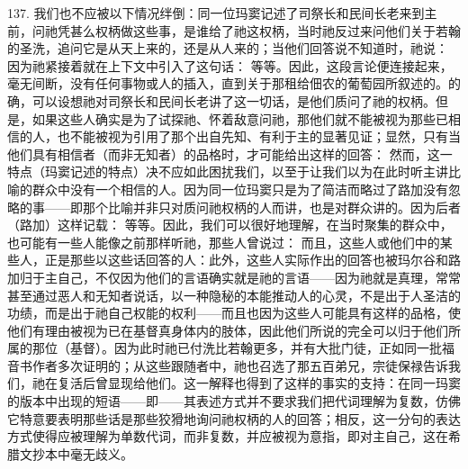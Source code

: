 137. 我们也不应被以下情况绊倒：同一位玛窦记述了司祭长和民间长老来到主前，问祂凭甚么权柄做这些事，是谁给了祂这权柄，当时祂反过来问他们关于若翰的圣洗，追问它是从天上来的，还是从人来的；当他们回答说不知道时，祂说： 因为祂紧接着就在上下文中引入了这句话： 等等。因此，这段言论便连接起来，毫无间断，没有任何事物或人的插入，直到关于那租给佃农的葡萄园所叙述的。的确，可以设想祂对司祭长和民间长老讲了这一切话，是他们质问了祂的权柄。但是，如果这些人确实是为了试探祂、怀着敌意问祂，那他们就不能被视为那些已相信的人，也不能被视为引用了那个出自先知、有利于主的显著见证；显然，只有当他们具有相信者（而非无知者）的品格时，才可能给出这样的回答： 然而，这一特点（玛窦记述的特点）决不应如此困扰我们，以至于让我们以为在此时听主讲比喻的群众中没有一个相信的人。因为同一位玛窦只是为了简洁而略过了路加没有忽略的事——即那个比喻并非只对质问祂权柄的人而讲，也是对群众讲的。因为后者（路加）这样记载： 等等。因此，我们可以很好地理解，在当时聚集的群众中，也可能有一些人能像之前那样听祂，那些人曾说过： 而且，这些人或他们中的某些人，正是那些以这些话回答的人：此外，这些人实际作出的回答也被玛尔谷和路加归于主自己，不仅因为他们的言语确实就是祂的言语——因为祂就是真理，常常甚至通过恶人和无知者说话，以一种隐秘的本能推动人的心灵，不是出于人圣洁的功绩，而是出于祂自己权能的权利——而且也因为这些人可能具有这样的品格，使他们有理由被视为已在基督真身体内的肢体，因此他们所说的完全可以归于他们所属的那位（基督）。因为此时祂已付洗比若翰更多，并有大批门徒，正如同一批福音书作者多次证明的；从这些跟随者中，祂也召选了那五百弟兄，宗徒保禄告诉我们，祂在复活后曾显现给他们。这一解释也得到了这样的事实的支持：在同一玛窦的版本中出现的短语——即——其表述方式并不要求我们把代词理解为复数，仿佛它特意要表明那些话是那些狡猾地询问祂权柄的人的回答；相反，这一分句的表达方式使得应被理解为单数代词，而非复数，并应被视为意指，即对主自己，这在希腊文抄本中毫无歧义。\par

